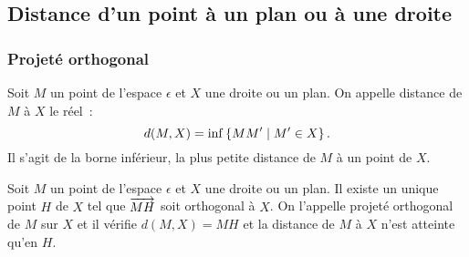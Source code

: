 \subsection{Distance d'un point à un plan ou à une droite}

\subsubsection{Projeté orthogonal}

\begin{defdef}
  Soit \(M\) un point de l'espace \(\epsilon\) et \(X\) une droite ou un 
  plan.  On appelle distance de \(M\) à \(X\) le réel~:
  \begin{equation}
    d(M, X) = \operatorname{inf}\left\{MM'\mathrel{}\middle|\mathrel{}M' \in X\right\}.
  \end{equation}
  Il s'agit de la borne inférieur, la plus petite distance de \(M\) à un 
  point de \(X\).
\end{defdef}

\begin{prop}
  Soit \(M\) un point de l'espace \(\epsilon\) et \(X\) une droite ou un 
  plan.  Il existe un unique point \(H\) de \(X\) tel que \(\overrightarrow{MH}\) soit 
  orthogonal à \(X\). On l'appelle projeté orthogonal de \(M\) sur \(X\) et 
  il vérifie \(d(M, X) = MH\) et la distance de \(M\) à \(X\) n'est atteinte 
  qu'en \(H\).
\end{prop}

